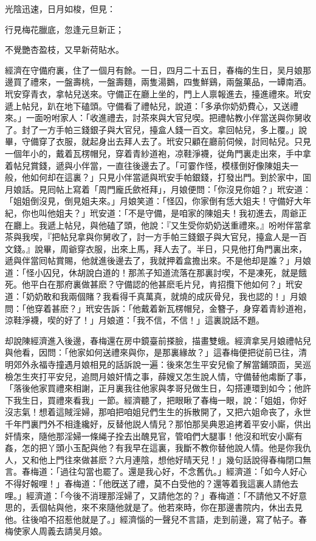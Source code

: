 光陰迅速，日月如梭，但見：

行見梅花臘底，忽逢元旦新正；

不覺艷杏盈枝，又早新荷貼水。

經濟在守備府裏，住了一個月有餘。一日，四月二十五日，春梅的生日，吴月娘那邊買了禮來，一盤壽桃，一盤壽麵，兩隻湯鵝，四隻鮮鷄，兩盤菓品，一罈南酒。玳安穿青衣，拿帖兒送來。守備正在廳上坐的，門上人禀報進去，擡進禮來。玳安遞上帖兒，趴在地下磕頭。守備看了禮帖兒，說道：「多承你奶奶費心，又送禮來。」一面吩咐家人：「收進禮去，討茶來與大官兒喫。把禮帖教小伴當送與你舅收了。封了一方手帕三錢銀子與大官兒，擡盒人錢一百文。拿回帖兒，多上覆。」說畢，守備穿了衣服，就起身出去拜人去了。玳安只顧在廳前伺候，討囘帖兒。只見一個年小的，戴着瓦楞帽兒，穿着青紗道袍，凉鞋淨襪，従角門裏走出來，手中拿着帖兒賞錢，遞與小伴當，一直往後邊去了。「可霎作怪，模樣倒好像陳姐夫一般，他如何却在這裏？」只見小伴當遞與玳安手帕銀錢，打發出門。到於家中，囬月娘話。見囘帖上寫着「周門龐氏歛袵拜」，月娘便問：「你沒見你姐？」玳安道：「姐姐倒沒見，倒見姐夫來。」月娘笑道：「怪囚，你家倒有恁大姐夫！守備好大年紀，你也叫他姐夫？」玳安道：「不是守備，是咱家的陳姐夫！我初進去，周爺正在廳上。我遞上帖兒，與他磕了頭，他說：『又生受你奶奶送重禮來。』吩咐伴當拿茶與我喫，『把帖兒拿與你舅收了，討一方手帕三錢銀子與大官兒，擡盒人是一百文錢。』說畢，周爺穿衣服，出來上馬，拜人去了。半日，只見他打角門裏出來，遞與伴當囘帖賞賜，他就進後邊去了，我就押着盒擔出來。不是他却是誰？」月娘道：「怪小囚兒，休胡說白道的！那羔子知道流落在那裏討喫，不是凍死，就是餓死。他平白在那府裏做甚麽？守備認的他甚麽毛片兒，肯招攬下他如何？」玳安道：「奶奶敢和我兩個賭？我看得千真萬真，就燒的成灰骨兒，我也認的！」月娘問：「他穿着甚麽？」玳安告訴：「他戴着新瓦楞帽兒，金簪子，身穿着青紗道袍，涼鞋淨襪，喫的好了！」月娘道：「我不信，不信！」這裏說話不題。

却說陳經濟進入後邊，春梅還在房中鏡臺前搽臉，描畫雙蛾。經濟拿吴月娘禮帖兒與他看，因問：「他家如何送禮來與你，是那裏緣故？」這春梅便把従前已往，清明郊外永福寺撞遇月娘相見的話訴說一遍：後來怎生平安兒偸了解當鋪頭靣，吴巡檢怎生夾打平安兒，追問月娘奸情之事，薛嫂又怎生說人情，守備替他䖏斷了事，「落後他家買禮來相謝，正月裏我往他家與孝哥兒做生日，勾搭連環到如今；他許下我生日，買禮來看我」一節。經濟聽了，把眼瞅了春梅一眼，說：「姐姐，你好沒志氣！想着這賊淫婦，那咱把咱姐兒們生生的拆散開了，又把六姐命丧了，永世千年門裏門外不相逢纔好，反替他説人情兒？那怕那吴典恩追拷着平安小廝，供出奸情來，隨他那淫婦一條䋲子拴去出醜見官，管咱們大腿事！他沒和玳安小廝有姦，怎的把丫頭小玉配與他？有我早在這裏，我斷不教你替他說人情。他是你我仇人，又和他上門往來做甚麽？六月連陰，想他好晴天兒！」幾句話說得春梅閉口無言。春梅道：「過往勾當也罷了。還是我心好，不念舊仇。」經濟道：「如今人好心不得好報哩！」春梅道：「他旣送了禮，莫不白受他的？還等着我這裏人請他去哩。」經濟道：「今後不消理那淫婦了，又請他怎的？」春梅道：「不請他又不好意思的，丢個帖與他，來不來隨他就是了。他若來時，你在那邊書院内，休出去見他。往後咱不招惹他就是了。」經濟惱的一聲兒不言語，走到前邊，寫了帖子。春梅使家人周義去請吴月娘。

